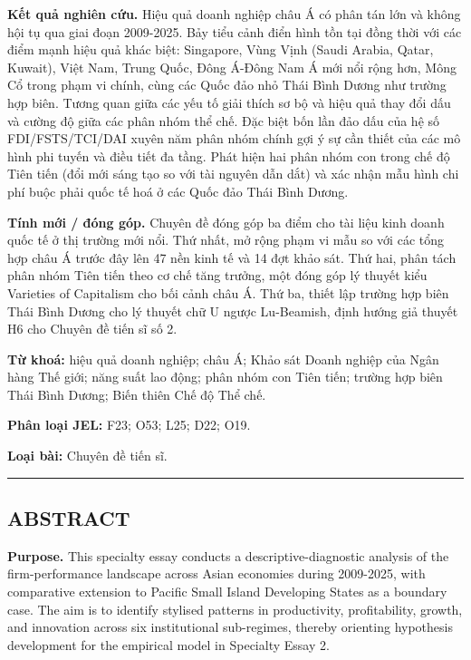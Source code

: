 \documentclass[12pt,a4paper]{article}
\begin{document}
\textbf{Kết quả nghiên cứu.} Hiệu quả doanh nghiệp châu Á có phân tán
lớn và không hội tụ qua giai đoạn 2009-2025. Bảy tiểu cảnh điển hình tồn
tại đồng thời với các điểm mạnh hiệu quả khác biệt: Singapore, Vùng Vịnh
(Saudi Arabia, Qatar, Kuwait), Việt Nam, Trung Quốc, Đông Á-Đông Nam Á
mới nổi rộng hơn, Mông Cổ trong phạm vi chính, cùng các Quốc đảo nhỏ
Thái Bình Dương như trường hợp biên. Tương quan giữa các yếu tố giải
thích sơ bộ và hiệu quả thay đổi dấu và cường độ giữa các phân nhóm thể
chế. Đặc biệt bốn lần đảo dấu của hệ số FDI/FSTS/TCI/DAI xuyên năm phân
nhóm chính gợi ý sự cần thiết của các mô hình phi tuyến và điều tiết đa
tầng. Phát hiện hai phân nhóm con trong chế độ Tiên tiến (đổi mới sáng
tạo so với tài nguyên dẫn dắt) và xác nhận mẫu hình chi phí buộc phải
quốc tế hoá ở các Quốc đảo Thái Bình Dương.

\textbf{Tính mới / đóng góp.} Chuyên đề đóng góp ba điểm cho tài liệu
kinh doanh quốc tế ở thị trường mới nổi. Thứ nhất, mở rộng phạm vi mẫu
so với các tổng hợp châu Á trước đây lên 47 nền kinh tế và 14 đợt khảo
sát. Thứ hai, phân tách phân nhóm Tiên tiến theo cơ chế tăng trưởng, một
đóng góp lý thuyết kiểu Varieties of Capitalism cho bối cảnh châu Á. Thứ
ba, thiết lập trường hợp biên Thái Bình Dương cho lý thuyết chữ U ngược
Lu-Beamish, định hướng giả thuyết H6 cho Chuyên đề tiến sĩ số 2.

\textbf{Từ khoá:} hiệu quả doanh nghiệp; châu Á; Khảo sát Doanh nghiệp
của Ngân hàng Thế giới; năng suất lao động; phân nhóm con Tiên tiến;
trường hợp biên Thái Bình Dương; Biến thiên Chế độ Thể chế.

\textbf{Phân loại JEL:} F23; O53; L25; D22; O19.

\textbf{Loại bài:} Chuyên đề tiến sĩ.

\begin{center}\rule{0.5\linewidth}{0.5pt}\end{center}

\hypertarget{abstract}{%
\subsection{ABSTRACT}\label{abstract}}

\textbf{Purpose.} This specialty essay conducts a descriptive-diagnostic
analysis of the firm-performance landscape across Asian economies during
2009-2025, with comparative extension to Pacific Small Island Developing
States as a boundary case. The aim is to identify stylised patterns in
productivity, profitability, growth, and innovation across six
institutional sub-regimes, thereby orienting hypothesis development for
the empirical model in Specialty Essay 2.
\end{document}
